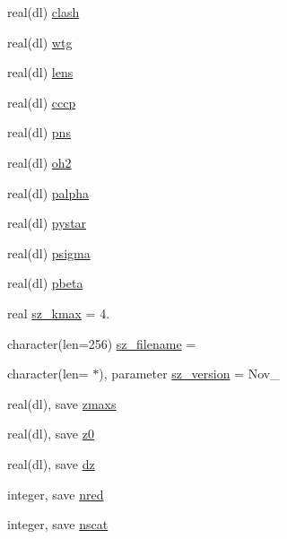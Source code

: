 \begin{DoxyCompactItemize}
\item 
real(dl) \mbox{\hyperlink{namespaceszcounts_adffd232373e78bf39d363f027f0564ff}{clash}}
\item 
real(dl) \mbox{\hyperlink{namespaceszcounts_a1e8fc0be8d32aa9edec391fdc16f1978}{wtg}}
\item 
real(dl) \mbox{\hyperlink{namespaceszcounts_a93fe6f6bac05415c56bdb59429db5345}{lens}}
\item 
real(dl) \mbox{\hyperlink{namespaceszcounts_a64fdba6e458ea314da7f871a1ec879ae}{cccp}}
\item 
real(dl) \mbox{\hyperlink{namespaceszcounts_afd77c97be9a90a59819249f5cc73760b}{pns}}
\item 
real(dl) \mbox{\hyperlink{namespaceszcounts_acb8cfec6e2fe1c42d1e65aa06c0b81df}{oh2}}
\item 
real(dl) \mbox{\hyperlink{namespaceszcounts_a162a76075580761ec2e15dd4e6d716fd}{palpha}}
\item 
real(dl) \mbox{\hyperlink{namespaceszcounts_af79e33e4d88161185c0ab245f42a51f2}{pystar}}
\item 
real(dl) \mbox{\hyperlink{namespaceszcounts_a6dfdc3232342e7579dcc7dae3506d7fd}{psigma}}
\item 
real(dl) \mbox{\hyperlink{namespaceszcounts_a195fa99a01ff79fd80fe03fb78b8b573}{pbeta}}
\item 
real \mbox{\hyperlink{namespaceszcounts_a8f0eaabdc83a62e45bf24daf1e820e76}{sz\+\_\+kmax}} = 4.
\item 
character(len=256) \mbox{\hyperlink{namespaceszcounts_ad7b2b406324ec451bf7199f40411f42b}{sz\+\_\+filename}} = \textquotesingle{}\textquotesingle{}
\item 
character(len= $\ast$), parameter \mbox{\hyperlink{namespaceszcounts_aa726969ed60d9d595227138f6fae1b5e}{sz\+\_\+version}} = \textquotesingle{}Nov\+\_\textquotesingle{}
\item 
real(dl), save \mbox{\hyperlink{namespaceszcounts_ab3202a28ada73a28c4052802235a7f04}{zmaxs}}
\item 
real(dl), save \mbox{\hyperlink{namespaceszcounts_a2718f37c5199b68be9ce1a3298a1a64f}{z0}}
\item 
real(dl), save \mbox{\hyperlink{namespaceszcounts_a6a402ad033e07eecf06cdd670fabfd78}{dz}}
\item 
integer, save \mbox{\hyperlink{namespaceszcounts_a16edd363d924414dcf42aff90a5b5cf1}{nred}}
\item 
integer, save \mbox{\hyperlink{namespaceszcounts_ae530cb9d64e88dd1ab20e603295c1d7b}{nscat}}
\end{DoxyCompactItemize}


